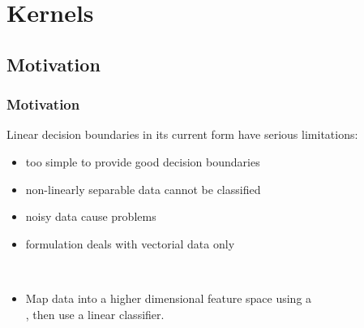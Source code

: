 \section{Kernels}

\subsection{Motivation}

\begin{frame}
	\frametitle{Motivation}

	Linear decision boundaries in its current form have serious limitations: \pause

	\begin{itemize}
		\item too simple to provide good decision boundaries \\[.3cm] \pause
		\item non-linearly separable data cannot be classified \\[.3cm] \pause
		\item noisy data cause problems \\[.3cm] \pause
		\item formulation deals with vectorial data only
	\end{itemize}
	\pspread

	 \\

	\begin{itemize}
		\item Map data into a higher dimensional feature space using a \\
		      ,
		      then use a linear classifier.
	\end{itemize}
\end{frame}


